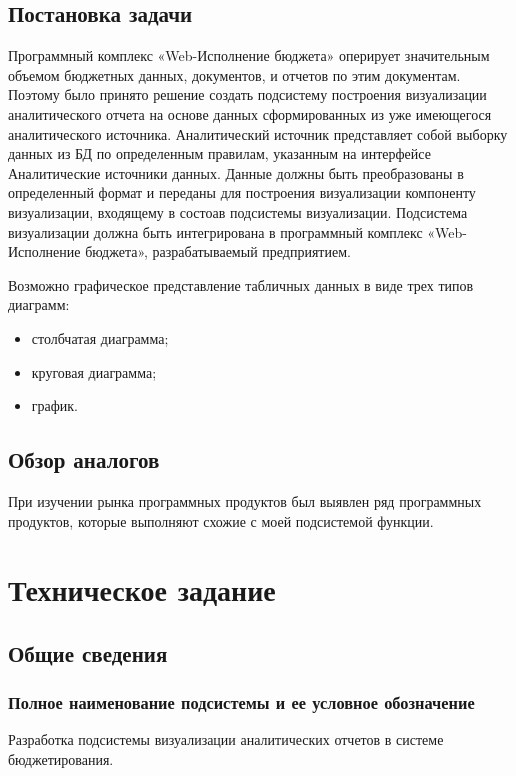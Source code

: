 \documentclass[a4paper]{extarticle}
\begin{document}
\subsection{Постановка задачи}
Программный комплекс «Web-Исполнение бюджета» оперирует значительным объемом бюджетных данных, документов, и отчетов по этим документам. Поэтому было принято решение создать подсистему построения визуализации аналитического отчета на основе данных сформированных из уже имеющегося аналитического источника. Аналитический источник представляет собой выборку данных из БД по определенным правилам, указанным на интерфейсе Аналитические источники данных. Данные должны быть преобразованы в определенный формат и переданы для построения визуализации компоненту визуализации, входящему в состоав подсистемы визуализации. Подсистема визуализации должна быть интегрирована в программный комплекс «Web-Исполнение бюджета», разрабатываемый предприятием.\par
Возможно графическое представление табличных данных в виде трех типов диаграмм:
\begin{itemize}
  \item столбчатая диаграмма;
  \item круговая диаграмма;
  \item график.
\end{itemize}\par

\subsection{Обзор аналогов}
При изучении рынка программных продуктов был выявлен ряд программных продуктов, которые выполняют схожие с моей подсистемой функции.

\section{Техническое задание}

\subsection{Общие сведения}

\subsubsection{Полное наименование подсистемы и ее условное обозначение}
Разработка подсистемы визуализации аналитических отчетов в системе бюджетирования.
\end{document}
